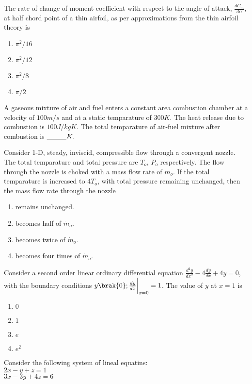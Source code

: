 	\item The rate of change of moment coefficient with respect to the angle of attack, $\frac{dC_m}{d\alpha}$, at half chord point of a thin airfoil, as per approximations from the thin airfoil theory is
		\begin{enumerate}
			\item $\pi^2/16$
			\item $\pi^2/12$
			\item $\pi^2/8$
			\item $\pi/2$
		\end{enumerate}
	\item A gaseous mixture of air and fuel enters a constant area combustion chamber at a velocity of $100 m/s$ and at a static temparature of $300 K$. The heat release due to combustion is $100 J/kgK$. The total temparature of air-fuel mixture after combustion is $\underline{\hspace{1 cm}} K$.
	\item Consider 1-D, steady, inviscid, compressible flow through a convergent nozzle. The total temparature and total pressure are $T_o$, $P_o$ respectively. The flow through the nozzle is choked with a mass flow rate of $m_o$. If the total temparature is increased to $4T_o$, with total pressure remaining unchanged, then the mass flow rate through the nozzle
		\begin{enumerate}
			\item remains unchanged.
			\item becomes half of $\dot{m}_o$.
			\item becomes twice of $\dot{m}_o$.
			\item becomes four times of $\dot{m}_o$.
		\end{enumerate}
	\item Consider a second order linear ordinary differential equation $\frac{d^2y}{dx^2}-4\frac{dy}{dx}+4y=0$, with the boundary conditions $y\brak{0};\frac{dy}{dx}\bigg|_{x=0}=1$. The value of $y$ at $x=1$ is
		\begin{enumerate}
			\item $0$
			\item $1$
			\item $e$
			\item $e^2$
		\end{enumerate}
	\item Consider the following system of lineal equatins: \\
		$2x-y+z=1$ \\
		$3x-3y+4z=6$ \\
